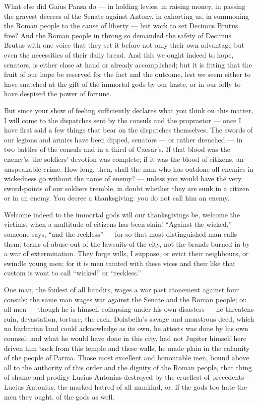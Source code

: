  What else did Gaius Pansa do --- in holding levies, in raising money, in passing the gravest decrees of the Senate against Antony, in exhorting us, in summoning the Roman people to the cause of liberty --- but work to set Decimus Brutus free? And the Roman people in throng so demanded the safety of Decimus Brutus with one voice that they set it before not only their own advantage but even the necessities of their daily bread. And this we ought indeed to hope, senators, is either close at hand or already accomplished; but it is fitting that the fruit of our hope be reserved for the fact and the outcome, lest we seem either to have snatched at the gift of the immortal gods by our haste, or in our folly to have despised the power of fortune.

 But since your show of feeling sufficiently declares what you think on this matter, I will come to the dispatches sent by the consuls and the propraetor --- once I have first said a few things that bear on the dispatches themselves. The swords of our legions and armies have been dipped, senators --- or rather drenched --- in two battles of the consuls and in a third of Caesar's. If that blood was the enemy's, the soldiers' devotion was complete; if it was the blood of citizens, an unspeakable crime. How long, then, shall the man who has outdone all enemies in wickedness go without the name of enemy? --- unless you would have the very sword-points of our soldiers tremble, in doubt whether they are sunk in a citizen or in an enemy. You decree a thanksgiving: you do not call him an enemy.

 Welcome indeed to the immortal gods will our thanksgivings be, welcome the victims, when a multitude of citizens has been slain! ``Against the wicked,'' someone says, ``and the reckless'' --- for so that most distinguished man calls them: terms of abuse out of the lawsuits of the city, not the brands burned in by a war of extermination. They forge wills, I suppose, or evict their neighbours, or swindle young men; for it is men tainted with these vices and their like that custom is wont to call ``wicked'' or ``reckless.''

 One man, the foulest of all bandits, wages a war past atonement against four consuls; the same man wages war against the Senate and the Roman people; on all men --- though he is himself collapsing under his own disasters --- he threatens ruin, devastation, torture, the rack. Dolabella's savage and monstrous deed, which no barbarian land could acknowledge as its own, he attests was done by his own counsel; and what he would have done in this city, had not Jupiter himself here driven him back from this temple and these walls, he made plain in the calamity of the people of Parma. Those most excellent and honourable men, bound above all to the authority of this order and the dignity of the Roman people, that thing of shame and prodigy Lucius Antonius destroyed by the cruellest of precedents --- Lucius Antonius, the marked hatred of all mankind, or, if the gods too hate the men they ought, of the gods as well.

